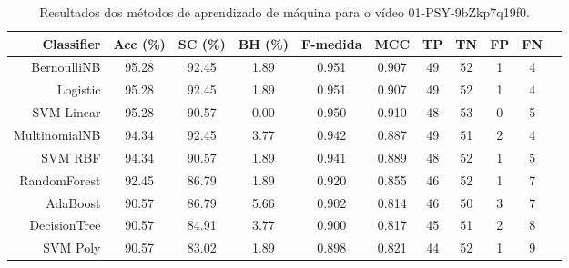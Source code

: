 \begin{table}[!htb]
\centering
\caption{Resultados dos métodos de aprendizado de máquina para o vídeo 01-PSY-9bZkp7q19f0.}
\label{tab:01-PSY-9bZkp7q19f0}
\begin{tabular}{r|c|c|c|c|c|c|c|c|c|c}
\hline\hline
Classifier & Acc (\%) & SC (\%) & BH (\%) & F-medida & MCC & TP & TN & FP & FN \\ \hline
BernoulliNB & 95.28 & 92.45 & 1.89 & 0.951 & 0.907 & 49 & 52 & 1 & 4 \\ 
Logistic & 95.28 & 92.45 & 1.89 & 0.951 & 0.907 & 49 & 52 & 1 & 4 \\ 
SVM Linear & 95.28 & 90.57 & 0.00 & 0.950 & 0.910 & 48 & 53 & 0 & 5 \\ 
MultinomialNB & 94.34 & 92.45 & 3.77 & 0.942 & 0.887 & 49 & 51 & 2 & 4 \\ 
SVM RBF & 94.34 & 90.57 & 1.89 & 0.941 & 0.889 & 48 & 52 & 1 & 5 \\ 
RandomForest & 92.45 & 86.79 & 1.89 & 0.920 & 0.855 & 46 & 52 & 1 & 7 \\ 
AdaBoost & 90.57 & 86.79 & 5.66 & 0.902 & 0.814 & 46 & 50 & 3 & 7 \\ 
DecisionTree & 90.57 & 84.91 & 3.77 & 0.900 & 0.817 & 45 & 51 & 2 & 8 \\ 
SVM Poly & 90.57 & 83.02 & 1.89 & 0.898 & 0.821 & 44 & 52 & 1 & 9 \\ 
\hline\hline
\end{tabular}
\end{table}
